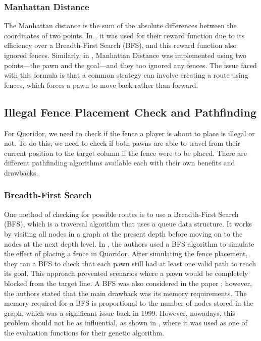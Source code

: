 \documentclass[review]{cmpreport}
\begin{document}
\subsubsection{Manhattan Distance}
The Manhattan distance is the sum of the absolute differences between the coordinates of two points. In \cite{josequoridor}, it was used for their reward function due to its efficiency over a Breadth-First Search (BFS), and this reward function also ignored fences. Similarly, in \cite{glendenning2005mastering}, Manhattan Distance was implemented using two points—the pawn and the goal—and they too ignored any fences. The issue faced with this formula is that a common strategy can involve creating a route using fences, which forces a pawn to move back rather than forward.

\subsection{Illegal Fence Placement Check and Pathfinding}
For Quoridor, we need to check if the fence a player is about to place is illegal or not. To do this, we need to check if both pawns are able to travel from their current position to the target column if the fence were to be placed. There are different pathfinding algorithms available each with their own benefits and drawbacks.

\subsubsection{Breadth-First Search}
One method of checking for possible routes is to use a Breadth-First Search (BFS), which is a traversal algorithm that uses a queue data structure. It works by visiting all nodes in a graph at the present depth before moving on to the nodes at the next depth level. In \cite{respall2018monte}, the authors used a BFS algorithm to simulate the effect of placing a fence in Quoridor. After simulating the fence placement, they ran a BFS to check that each pawn still had at least one valid path to reach its goal. This approach prevented scenarios where a pawn would be completely blocked from the target line. A BFS was also considered in the paper \cite{korf1999artificial}; however, the authors stated that the main drawback was its memory requirements. The memory required for a BFS is proportional to the number of nodes stored in the graph, which was a significant issue back in 1999. However, nowadays, this problem should not be as influential, as shown in \cite{josequoridor}, where it was used as one of the evaluation functions for their genetic algorithm.
\end{document}
